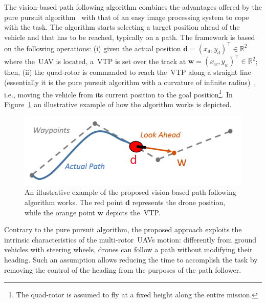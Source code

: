 The vision-based path following algorithm combines the advantages offered by the pure pursuit algorithm~\cite{14_coulter1992implementation} with that of an easy image processing system to cope with the task. The algorithm starts selecting a target position ahead of the vehicle and that has to be reached, typically on a path. The framework is based on the following operations: (i) given the actual position $\mathbf{d}=(x_d, y_d)^\top \in \mathbb{R}^2$ where the~\gls{UAV} is located, a~\gls{VTP} is set over the track at $\mathbf{w}=(x_w, y_w)^\top \in \mathbb{R}^2$; then, (ii) the quad-rotor is commanded to reach the~\gls{VTP} along a straight line (essentially it is the pure pursuit algorithm with a curvature of infinite radius)~\cite{14_coulter1992implementation}, i.e., moving the vehicle from its current position to the goal position\footnote{The quad-rotor is assumed to fly at a fixed height along the entire mission.}. In Figure~\ref{fig:pure pursuit} an illustrative example of how the algorithm works is depicted. 

\begin{figure}
	\centering
	\includegraphics[scale=0.75]{figure/Part1/Chapter3/figures/purepursuit.png}
	\caption{An illustrative example of the proposed vision-based path following algorithm works. The red point $\mathbf{d}$ represents the drone position, while the orange point $\mathbf{w}$ depicts the~\gls{VTP}.}
	\label{fig:pure pursuit}
\end{figure}

Contrary to the pure pursuit algorithm, the proposed approach exploits the intrinsic characteristics of the multi-rotor~\glspl{UAV} motion: differently from ground vehicles with steering wheels, drones can follow a path without modifying their heading. Such an assumption allows reducing the time to accomplish the task by removing the control of the heading from the purposes of the path follower. %

